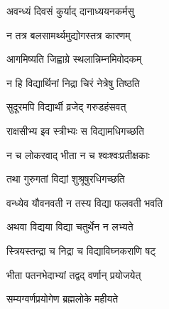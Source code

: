 {अवन्ध्यं दिवसं कुर्याद् दानाध्ययनकर्मसु}

{न तत्र बलसामर्थ्यमुद्योगस्तत्र कारणम्}

{आगमिष्यति जिह्वाग्रे स्थलान्निम्नमिवोदकम्}

{न हि विद्यार्थिनां निद्रा चिरं नेत्रेषु तिष्ठति}

{सुदूरमपि विद्यार्थी व्रजेद् गरुडहंसवत्}

{राक्षसीभ्य इव स्त्रीभ्यः स विद्यामधिगच्छति}

{न च लोकरवाद् भीता न च श्वःश्वःप्रतीक्षकाः}

{तथा गुरुगतां विद्यां शुश्रूषुरधिगच्छति}

{वन्ध्येव यौवनवती न तस्य विद्या फलवती भवति}

{अथवा विद्यया विद्या चतुर्थेन न लभ्यते}

{स्त्रियस्तन्द्रा च निद्रा च विद्याविघ्नकराणि षट्}

{भीता पतनभेदाभ्यां तद्वद् वर्णान् प्रयोजयेत्}

{सम्यग्वर्णप्रयोगेण ब्रह्मलोके महीयते}

\closesection